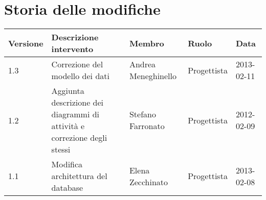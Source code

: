 \section*{Storia delle modifiche}
\begin{center}
\begin{longtable}{lp{}lll}
\toprule
Versione & Descrizione intervento & Membro & Ruolo & Data\\
\midrule
1.3 & Correzione del modello dei dati & Andrea Meneghinello & Progettista & 2013-02-11\\
1.2 & Aggiunta descrizione dei diagrammi di attività e correzione degli stessi & Stefano Farronato & Progettista & 2012-02-09\\
1.1 & Modifica architettura del database & Elena Zecchinato & Progettista & 2013-02-08\\


\end{longtable}
\end{center}
